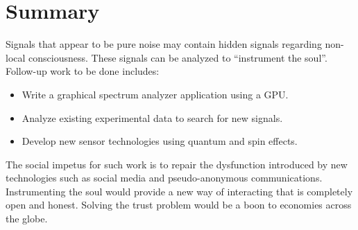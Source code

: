 \section{Summary}

Signals that appear to be pure noise may contain hidden signals regarding non-local consciousness.
These signals can be analyzed to ``instrument the soul''.
Follow-up work to be done includes:

\begin{itemize}
	\item Write a graphical spectrum analyzer application using a GPU.
	\item Analyze existing experimental data to search for new signals.
	\item Develop new sensor technologies using quantum and spin effects.
\end{itemize}

The social impetus for such work is to repair the dysfunction introduced by
new technologies such as social media and pseudo-anonymous communications.
Instrumenting the soul would provide a new way of interacting that is completely open and honest.
Solving the trust problem would be a boon to economies across the globe.
